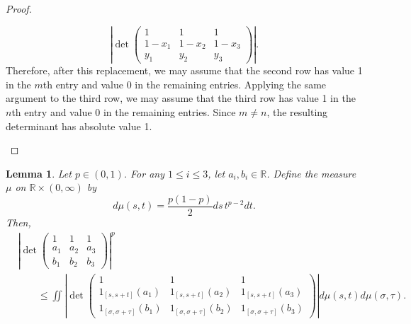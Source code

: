 \documentclass[11pt,a4paper]{amsart}
\theoremstyle{plain}
\newtheorem{lemma}[theorem]{Lemma}
\theoremstyle{definition}
\newcommand{\R}{\mathbb R}
\begin{document}
\begin{proof}
\begin{enumerate}[wide =0pt, labelwidth= 1.1cm]
\[            \left|\operatorname{det}\left(\begin{array}{ccc}1 & 1 & 1 \\ 1- x_1 & 1- x_2  & 1- x_3 \\ y_1 & y_2 & y_3\end{array}\right)\right|.
        \]
        Therefore, after this replacement, we may assume that the second row has value 1 in the $m$th entry and value 0 in the remaining entries. Applying the same argument to the third row, we may assume that the third row has value 1 in the $n$th entry and value 0 in the remaining entries. Since $m \neq n$, the resulting determinant has absolute value  1. \qedhere
    \end{enumerate}
\end{proof}

\begin{lemma} \label{lem:desired-ineq-12}
    Let $ p \in (0,1) $. For any $ 1 \leq i \leq 3 $, let $ a_i, b_i \in \R$. Define the measure $\mu$ on $\R \times (0,\infty)$ by 
    $$
        d \mu (s,t) = \frac{p(1-p)}{2} d s \, t^{p-2} d t.
    $$ 
    Then, 
    \begin{equation}
    \begin{split} 
        &\left|\operatorname{det}\left(\begin{array}{ccc}1 & 1 & 1 \\ a_1 & a_2 & a_3 \\ b_1 & b_2 & b_3\end{array}\right)\right|^p  
        \\
        &\qquad \leq
        \iint\left|\operatorname{det}\left(\begin{array}{ccc}1 & 1 & 1 \\ 1_{[s,s+t]}(a_1) & 1_{[s,s+t]}(a_2) & 1_{[s,s+t]}(a_3) \\ 1_{[\sigma,\sigma+\tau]}(b_1) & 1_{[\sigma,\sigma+\tau]}(b_2) & 1_{[\sigma,\sigma+\tau]}(b_3)
        \end{array}\right)\right| d \mu(s, t) d \mu(\sigma, \tau).
    \end{split} \label{eq:desired-ineq-12}
    \end{equation}
\end{lemma}
\end{document}
